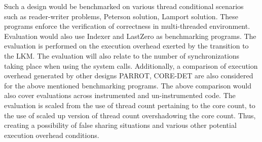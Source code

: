 \documentclass[12pt]{article}
\begin{document}
Such a design would be benchmarked on various thread conditional scenarios such as reader-writer problems, Peterson solution, Lamport solution. 
These programs enforce the verification of correctness in multi-threaded environment. 
Evaluation would also use Indexer and LastZero as benchmarking programs. 
The evaluation is performed on the execution overhead exerted by the transition to the LKM. 
The evaluation will also relate to the number of synchronizations taking place when using the system calls. 
Additionally, a comparison of execution overhead generated by other designs PARROT, CORE-DET are also considered for the above mentioned benchmarking programs. 
The above comparison would also cover evaluations across instrumented and un-instrumented code. 
The evaluation is scaled from the use of thread count pertaining to the core count, to the use of scaled up version of thread count overshadowing the core count. 
Thus, creating a possibility of false sharing situations and various other potential execution overhead conditions. 
\end{document}
